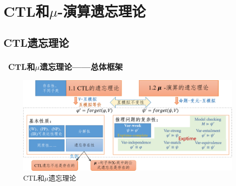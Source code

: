 \documentclass[9pt, CJK]{beamer}
\begin{document}
\section{CTL和$\mu$-演算遗忘理论}
\subsection{CTL遗忘理论}  
\begin{frame}  
	\frametitle{~CTL和$\mu$遗忘理论——{\footnotesize 总体框架}}
	\begin{figure}
		\includegraphics[scale=0.35]{figures/ctlMuForgFrame}
		\caption{CTL和$\mu$遗忘理论}
	\end{figure}
\end{frame}
		
\end{document}
